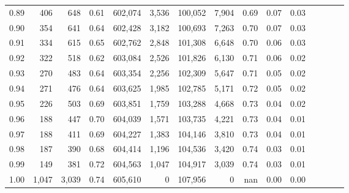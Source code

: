 \begin{tabular}{rrrcrrrrrrrrrrr}
0.89 &     406 &    648 &                                       0.61 &  602,074 &    3,536 &  100,052 &    7,904 &  0.69 &  0.07 &                         0.03 \\
0.90 &     354 &    641 &                                       0.64 &  602,428 &    3,182 &  100,693 &    7,263 &  0.70 &  0.07 &                         0.03 \\
0.91 &     334 &    615 &                                       0.65 &  602,762 &    2,848 &  101,308 &    6,648 &  0.70 &  0.06 &                         0.03 \\
0.92 &     322 &    518 &                                       0.62 &  603,084 &    2,526 &  101,826 &    6,130 &  0.71 &  0.06 &                         0.02 \\
0.93 &     270 &    483 &                                       0.64 &  603,354 &    2,256 &  102,309 &    5,647 &  0.71 &  0.05 &                         0.02 \\
0.94 &     271 &    476 &                                       0.64 &  603,625 &    1,985 &  102,785 &    5,171 &  0.72 &  0.05 &                         0.02 \\
0.95 &     226 &    503 &                                       0.69 &  603,851 &    1,759 &  103,288 &    4,668 &  0.73 &  0.04 &                         0.02 \\
0.96 &     188 &    447 &                                       0.70 &  604,039 &    1,571 &  103,735 &    4,221 &  0.73 &  0.04 &                         0.01 \\
0.97 &     188 &    411 &                                       0.69 &  604,227 &    1,383 &  104,146 &    3,810 &  0.73 &  0.04 &                         0.01 \\
0.98 &     187 &    390 &                                       0.68 &  604,414 &    1,196 &  104,536 &    3,420 &  0.74 &  0.03 &                         0.01 \\
0.99 &     149 &    381 &                                       0.72 &  604,563 &    1,047 &  104,917 &    3,039 &  0.74 &  0.03 &                         0.01 \\
1.00 &   1,047 &  3,039 &                                       0.74 &  605,610 &        0 &  107,956 &        0 &   nan &  0.00 &                         0.00 \\
\bottomrule
\end{tabular}
